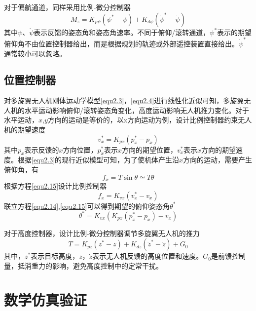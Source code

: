 对于偏航通道，同样采用比例-微分控制器
\begin{equation}
\label{equ2.13}
M_z = K_{p\psi} \left( \psi^* - \psi \right) + K_{d\psi} \left( \dot{\psi}^* -  \dot{\psi} \right)
\end{equation}
其中$\psi$、$\dot{\psi}$表示反馈的姿态角和姿态角速率。不同于俯仰/滚转通道，$\psi^*$表示的期望俯仰角不由位置控制器给出，而是根据规划的轨迹或外部遥控装置直接给出。$ \dot{\psi}^*$通常较小可以忽略。

\subsection{位置控制器}
对多旋翼无人机刚体运动学模型\eqref{equ2.3}，\eqref{equ2.4}进行线性化近似可知，多旋翼无人机的水平运动影响俯仰/滚转姿态角变化，高度运动影响无人机推力变化。对于水平运动，$x$,$y$方向的运动是等价的，以x方向运动为例，设计比例控制器约束无人机的期望速度
\begin{equation}
\label{equ2.14}
v_x^* =  K_{px} \left( p_x^* - p_x \right)
\end{equation}
其中$p_x $表示反馈的$x$方向位置，$p_x^*$表示$x$方向的期望位置，$v_x^*$表示$x$方向的期望速度。根据\eqref{equ2.3}的现行近似模型可知，为了使机体产生沿$x$方向的运动，需要产生俯仰角，有
\begin{equation}
\label{equ2.15}
f_x = T \sin\theta \simeq T \theta
\end{equation}
根据方程\eqref{equ2.15}设计比例控制器
\begin{equation}
f_x = K_{vx} \left(  v_x^* - v_x \right)
\end{equation}
联立方程\eqref{equ2.14},\eqref{equ2.15}可以得到期望的俯仰姿态角$\theta^*$
\begin{equation}
\label{equ2.16}
\theta^* = K_{vx} \left( K_{px} \left( p_x^* - p_x \right) - v_x \right)
\end{equation}

对于高度控制器，设计比例-微分控制器调节多旋翼无人机的推力
\begin{equation}
\label{equ2.17}
T = K_{pz} \left( z^* -z  \right) + K_{dz} \left( \dot{z}^* - \dot{z}  \right) + G_0
\end{equation}
其中，$z^*$表示目标高度，$z$，$\dot{z}$表示无人机反馈的高度位置和速度。$G_0$是前馈控制量，抵消重力的影响，避免高度控制中的定常干扰。

\section{ 数学仿真验证}



